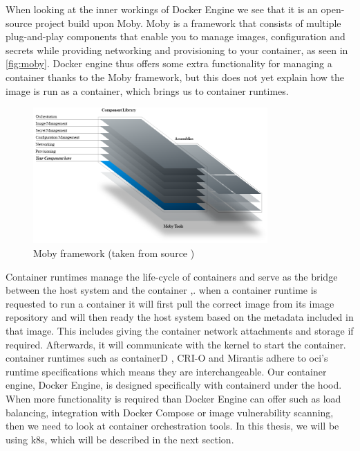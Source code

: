 When looking at the inner workings of Docker Engine we see that it is an open-source project build upon Moby\cite{moby}. Moby is a framework that consists of multiple plug-and-play components that enable you to manage images, configuration and secrets while providing networking and provisioning to your container, as seen in \autoref{fig:moby}. Docker engine thus offers some extra functionality for managing a container thanks to the Moby framework, but this does not yet explain how the image is run as a container, which brings us to container runtimes.
\\[10pt]

\begin{figure}[htbp]
  \centering
  \includegraphics[width=0.8\textwidth]{images/moby.png} 
  \caption{Moby framework (taken from source \cite{moby})}
  \label{fig:moby}
\end{figure}

 Container runtimes manage the life-cycle of containers and serve as the bridge between the host system and the container \cite{containerterminology},\cite{contruntime}. when a container runtime is requested to run a container it will first pull the correct image from its image repository and will then ready the host system based on the metadata included in that image. This includes giving the container network attachments and storage if required. Afterwards, it will communicate with the kernel to start the container. container runtimes such as containerD \cite{containerd}, CRI-O \cite{crio} and Mirantis \cite{mirantis} adhere to \acrshort{oci}'s runtime specifications which means they are interchangeable. Our container engine, Docker Engine, is designed specifically with containerd under the hood.
\\[10pt]

When more functionality is required than Docker Engine can offer such as load balancing, integration with Docker Compose or image vulnerability scanning, then we need to look at container orchestration tools. In this thesis, we will be using \acrshort{k8s}, which will be described in the next section.
\\[10pt]



